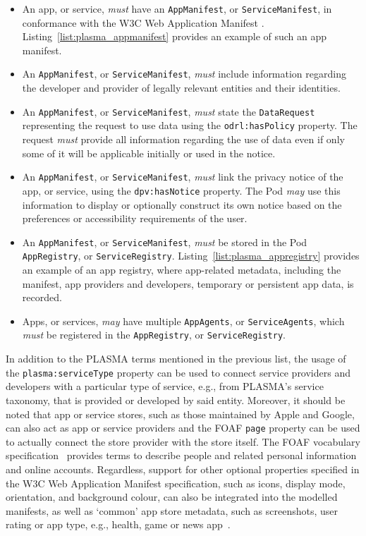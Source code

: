 \begin{itemize}
    \item An app, or service, \textit{must} have an \texttt{AppManifest}, or \texttt{ServiceManifest}, in conformance with the W3C Web Application Manifest \citep{manifest_2023}. Listing~\ref{list:plasma_appmanifest} provides an example of such an app manifest.
    \item An \texttt{AppManifest}, or \texttt{ServiceManifest}, \textit{must} include information regarding the developer and provider of legally relevant entities and their identities.
    \item An \texttt{AppManifest}, or \texttt{ServiceManifest}, \textit{must} state the \texttt{DataRequest} representing the request to use data using the \texttt{odrl:hasPolicy} property. The request \textit{must} provide all information regarding the use of data even if only some of it will be applicable initially or used in the notice.
    \item An \texttt{AppManifest}, or \texttt{ServiceManifest}, \textit{must} link the privacy notice of the app, or service, using the \texttt{dpv:hasNotice} property. The Pod \textit{may} use this information to display or optionally construct its own notice based on the preferences or accessibility requirements of the user.
    \item An \texttt{AppManifest}, or \texttt{ServiceManifest}, \textit{must} be stored in the Pod \texttt{AppRegistry}, or \texttt{ServiceRegistry}. Listing~\ref{list:plasma_appregistry} provides an example of an app registry, where app-related metadata, including the manifest, app providers and developers, temporary or persistent app data, is recorded.
    \item Apps, or services, \textit{may} have multiple \texttt{AppAgents}, or \texttt{ServiceAgents}, which \textit{must} be registered in the \texttt{AppRegistry}, or \texttt{ServiceRegistry}.
\end{itemize}

In addition to the PLASMA terms mentioned in the previous list, the usage of the \texttt{plasma:serviceType} property can be used to connect service providers and developers with a particular type of service, e.g., from PLASMA's service taxonomy, that is provided or developed by said entity.
Moreover, it should be noted that app or service stores, such as those maintained by Apple and Google, can also act as app or service providers and the FOAF \texttt{page} property can be used to actually connect the store provider with the store itself.
The FOAF vocabulary specification~\citep{brickley_foaf_2004} provides terms to describe people and related personal information and online accounts.
Regardless, support for other optional properties specified in the W3C Web Application Manifest specification, such as icons, display mode, orientation, and background colour, can also be integrated into the modelled manifests, as well as `common' app store metadata, such as screenshots, user rating or app type, e.g., health, game or news app~\citep{gustafson_web_2023}.

